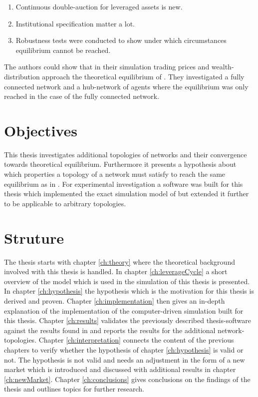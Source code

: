 \documentclass[Bachelorarbeit.tex]{subfiles}
\begin{document}
\begin{enumerate}
\item Continuous double-auction for leveraged assets is new.
\item Institutional specification matter a lot.
\item Robustness tests were conducted to show under which circumstances equilibrium cannot be reached.
\end{enumerate}

The authors could show that in their simulation trading prices and wealth-distribution approach the theoretical equilibrium of \cite{Geanakoplos2009}. They investigated a fully connected network and a hub-network of agents where the equilibrium was only reached in the case of the fully connected network. 

\section{Objectives}
This thesis investigates additional topologies of networks and their convergence towards theoretical equilibrium. Furthermore it presents a hypothesis about which properties a topology of a network must satisfy to reach the same equilibrium as in \cite{Breuer2015}. For experimental investigation a software was built for this thesis which implemented the exact simulation model of \cite{Breuer2015} but extended it further to be applicable to arbitrary topologies.

\section{Struture}
The thesis starts with chapter \ref{ch:theory} where the theoretical background involved with this thesis is handled. In chapter \ref{ch:leverageCycle} a short overview of the model which is used in the simulation of this thesis is presented. In chapter \ref{ch:hypothesis} the hypothesis which is the motivation for this thesis is derived and proven. Chapter \ref{ch:implementation} then gives an in-depth explanation of the implementation of the computer-driven simulation built for this thesis. Chapter \ref{ch:results} validates the previously described thesis-software against the results found in \cite{Breuer2015} and reports the results for the additional network-topologies. Chapter \ref{ch:interpretation} connects the content of the previous chapters to verify whether the hypothesis of chapter \ref{ch:hypothesis} is valid or not. The hypothesis is not valid and needs an adjustment in the form of a new market which is introduced and discussed with additional results in chapter \ref{ch:newMarket}. Chapter \ref{ch:conclusions} gives conclusions on the findings of the thesis and outlines topics for further research.
\end{document}
